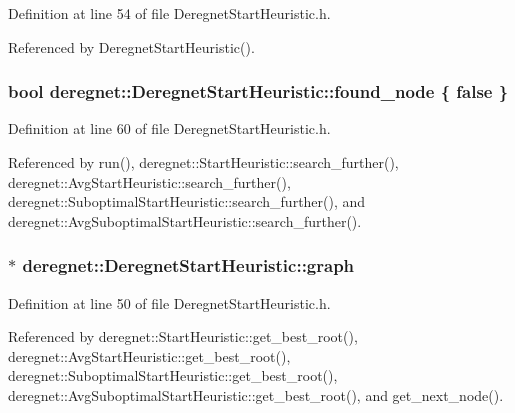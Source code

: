 Definition at line 54 of file Deregnet\+Start\+Heuristic.\+h.



Referenced by Deregnet\+Start\+Heuristic().

\subsubsection[{\texorpdfstring{found\+\_\+node}{found_node}}]{\setlength{\rightskip}{0pt plus 5cm}bool deregnet\+::\+Deregnet\+Start\+Heuristic\+::found\+\_\+node \{ false \}\hspace{0.3cm}{\ttfamily [protected]}}\hypertarget{classderegnet_1_1DeregnetStartHeuristic_a1ca705794583fb3b6e563efeceb4445e}{}\label{classderegnet_1_1DeregnetStartHeuristic_a1ca705794583fb3b6e563efeceb4445e}


Definition at line 60 of file Deregnet\+Start\+Heuristic.\+h.



Referenced by run(), deregnet\+::\+Start\+Heuristic\+::search\+\_\+further(), deregnet\+::\+Avg\+Start\+Heuristic\+::search\+\_\+further(), deregnet\+::\+Suboptimal\+Start\+Heuristic\+::search\+\_\+further(), and deregnet\+::\+Avg\+Suboptimal\+Start\+Heuristic\+::search\+\_\+further().

\subsubsection[{\texorpdfstring{graph}{graph}}]{$\ast$ deregnet\+::\+Deregnet\+Start\+Heuristic\+::graph\hspace{0.3cm}{\ttfamily [protected]}}\hypertarget{classderegnet_1_1DeregnetStartHeuristic_a4da8e53fc7c0fa3dbe0e3ef07296d75e}{}\label{classderegnet_1_1DeregnetStartHeuristic_a4da8e53fc7c0fa3dbe0e3ef07296d75e}


Definition at line 50 of file Deregnet\+Start\+Heuristic.\+h.



Referenced by deregnet\+::\+Start\+Heuristic\+::get\+\_\+best\+\_\+root(), deregnet\+::\+Avg\+Start\+Heuristic\+::get\+\_\+best\+\_\+root(), deregnet\+::\+Suboptimal\+Start\+Heuristic\+::get\+\_\+best\+\_\+root(), deregnet\+::\+Avg\+Suboptimal\+Start\+Heuristic\+::get\+\_\+best\+\_\+root(), and get\+\_\+next\+\_\+node().

